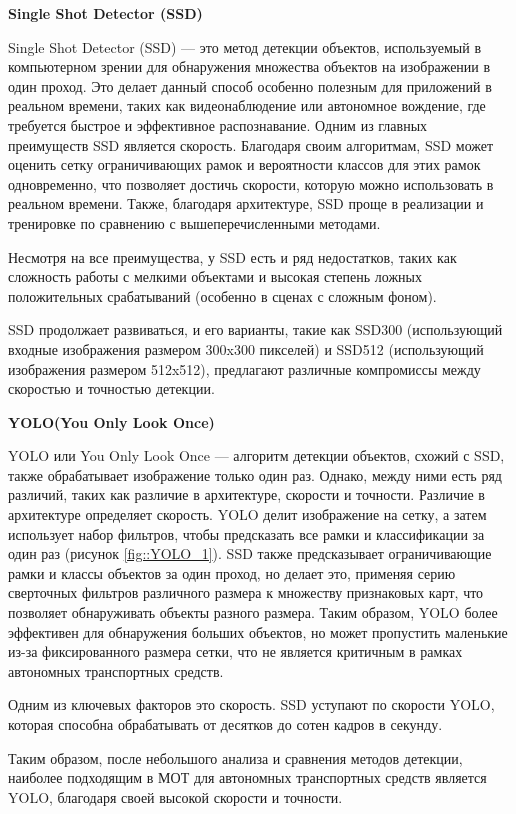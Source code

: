\textbf{Single Shot Detector (SSD)}

Single Shot Detector (SSD) --- это метод детекции объектов, используемый в компьютерном зрении для обнаружения множества объектов на изображении в один проход. Это делает данный способ особенно полезным для приложений в реальном времени, таких как видеонаблюдение или автономное вождение, где требуется быстрое и эффективное распознавание. Одним из главных преимуществ SSD является скорость. Благодаря своим алгоритмам, SSD может оценить сетку ограничивающих рамок и вероятности классов для этих рамок одновременно, что позволяет достичь скорости, которую можно использовать в реальном времени. Также, благодаря архитектуре, SSD проще в реализации и тренировке по сравнению с вышеперечисленными методами.

Несмотря на все преимущества, у SSD есть и ряд недостатков, таких как сложность работы с мелкими объектами и высокая степень ложных положительных срабатываний (особенно в сценах с сложным фоном).

SSD продолжает развиваться, и его варианты, такие как SSD300 (использующий входные изображения размером 300x300 пикселей) и SSD512 (использующий изображения размером 512x512), предлагают различные компромиссы между скоростью и точностью детекции.

\textbf{YOLO(You Only Look Once)}

YOLO или You Only Look Once --- алгоритм детекции объектов, схожий с SSD, также обрабатывает изображение только один раз. Однако, между ними есть ряд различий, таких как различие в архитектуре, скорости и точности. Различие в архитектуре определяет скорость. YOLO делит изображение на сетку, а затем использует набор фильтров, чтобы предсказать все рамки и классификации за один раз (рисунок \ref{fig::YOLO_1}). SSD также предсказывает ограничивающие рамки и классы объектов за один проход, но делает это, применяя серию сверточных фильтров различного размера к множеству признаковых карт, что позволяет обнаруживать объекты разного размера. Таким образом, YOLO более эффективен для обнаружения больших объектов, но может пропустить маленькие из-за фиксированного размера сетки, что не является критичным в рамках автономных транспортных средств. 


Одним из ключевых факторов это скорость. SSD уступают по скорости YOLO, которая способна обрабатывать от десятков до сотен кадров в секунду. 

Таким образом, после небольшого анализа и сравнения методов детекции, наиболее подходящим  в МОТ для автономных транспортных средств является YOLO, благодаря своей высокой скорости и точности.

